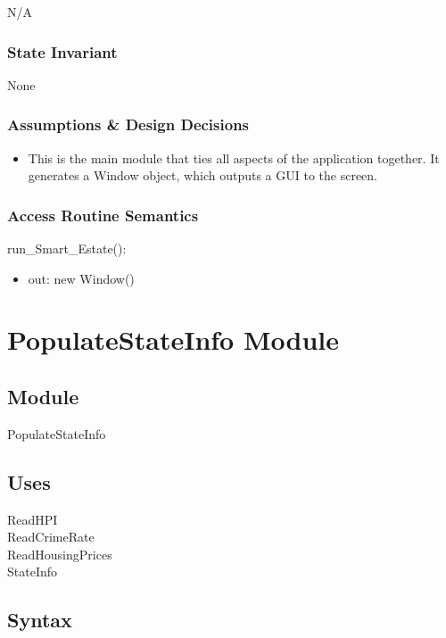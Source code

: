 \documentclass[12pt]{article}
\begin{document}
N/A

\subsubsection* {State Invariant}

None

\subsubsection* {Assumptions \& Design Decisions}

\begin{itemize}
\item This is the main module that ties all aspects of the application together. It generates a Window object, which outputs a GUI to the screen.
\end{itemize}

\subsubsection* {Access Routine Semantics}

run\_Smart\_Estate():
\begin{itemize}
\item out: new Window()
\end{itemize}

\newpage

\section* {PopulateStateInfo Module}

\subsection* {Module}

PopulateStateInfo

\subsection* {Uses}

ReadHPI\\
ReadCrimeRate\\
ReadHousingPrices\\
StateInfo

\subsection* {Syntax}
\end{document}
